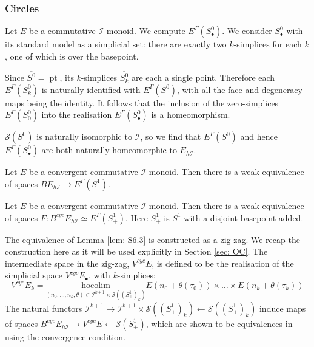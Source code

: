 \documentclass{TPmod}
\newcommand{\hocolim}{\mathrm{hocolim}}
\newcommand{\pt}{\operatorname{pt}}
\newcommand{\cI}{\mathcal{I}}
\newcommand{\cS}{\mathcal{S}}
\numberwithin{equation}{section}
\begin{document}
\subsubsection{Circles}


    
    \begin{ex}
        Let $E$ be a commutative $\cI$-monoid. We compute $E^\Gamma(S^0_\bullet)$. We consider $S^0_\bullet$ with its standard model as a simplicial set: there are exactly two $k$-simplices for each $k$, one of which is over the basepoint.

        Since $\overline{S^0} = \pt$, its $k$-simplices $\overline{S^0_k}$ are each a single point. Therefore each $E^\Gamma(S^0_k)$ is naturally identified with $E^\Gamma(S^0)$, with all the face and degeneracy maps being the identity. It follows that the inclusion of the zero-simplices $E^\Gamma(S^0_0)$ into the realisation $E^\Gamma(S^0_\bullet)$ is a homeomorphism.

        $\cS(S^0)$ is naturally isomorphic to $\cI$, so we find that $E^\Gamma(S^0)$ and hence $E^\Gamma(S^0_\bullet)$ are both naturally homeomorphic to $E_{h\cI}$. 
    \end{ex}


    
    
    

    \begin{lem}\label{lem: gam delop}
        Let $E$ be a convergent commutative $\cI$-monoid. Then there is a weak equivalence of spaces $BE_{h\cI} \to E^\Gamma(S^1)$.
    \end{lem}

    \begin{lem}\label{lem: S6.3}
        Let $E$ be a convergent commutative $\cI$-monoid. Then there is a weak equivalence of spaces $F: B^{cyc}E_{h\cI} \simeq E^\Gamma(S^1_+)$. Here $S^1_+$ is $S^1$ with a disjoint basepoint added.
    \end{lem}
    The equivalence of Lemma \ref{lem: S6.3} is constructed as a zig-zag. We recap the construction here as it will be used explicitly in Section \ref{sec: OC}. The intermediate space in the zig-zag, $V^{cyc}E$, is defined to be the realisation of the simplicial space $V^{cyc}E_\bullet$, with $k$-simplices:
    \begin{equation}\label{eq: Vcyc}
        V^{cyc}E_k = \underset{(n_0, \ldots, n_k, \theta)\in\cI^{k+1} \times \cS((S^1_+)_k)}{\hocolim} E(n_0+\theta(\tau_0)) \times \ldots \times E(n_k+\theta(\tau_k))
    \end{equation}
    The natural functors $\cI^{k+1} \to \cI^{k+1} \times \cS((S^1_+)_k) \leftarrow \cS((S^1_+)_k)$ induce maps of spaces $B^{cyc}E_{h\cI} \to V^{cyc}E \leftarrow \cS(S^1_+)$, which are shown to be equivalences in \cite{Schlichtkrull} using the convergence condition.
\end{document}
